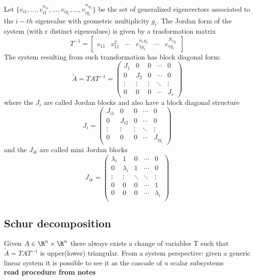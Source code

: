 \documentclass[english]{lectures}
\begin{document}
Let $\{v_{i1},\dots,v_{i1}^{n_{i1}},\dots,v_{ig_i},\dots,v_{ig_i}^{n_{ig_i}}\}$ be the set of generalized eigenvectors associated to the $i-th$ eigenvalue with geometric multiplicity $g_i$. The Jordan form of the system (with r distinct eigenvalues) is given by a trasformation matrix
\[
T^{-1}=\begin{bmatrix}
    v_{11} & v_{11}^2 & \cdots & v_{1g_1}^{n_1{g_1}} & \cdots & v_{rg_r}^{N_{rg_r}}
    \end{bmatrix}
\]
The system resulting from such transformation has block diagonal form:
\[
\tilde{A} = TAT^{-1} = \begin{pmatrix}
    J_1 & 0 & 0 & \cdots & 0\\
    0 & J_2 & 0 & \cdots & 0\\
    \vdots & \vdots & \vdots &\ddots & \vdots\\
    0 & 0 & 0 & \cdots & J_r
\end{pmatrix}
\]
where the $J_i$ are called Jordan blocks and also have a block diagonal structure
\[
J_i = \begin{pmatrix}
    J_{i1} & 0 & 0 & \cdots & 0\\
    0 & J_{i2} & 0 & \cdots & 0\\
    \vdots & \vdots & \vdots &\ddots & \vdots\\
    0 & 0 & 0 & \cdots & J_{ig_i}
\end{pmatrix}
\]
and the $J_{ik}$ are called mini Jordan blocks
\[
J_{ik} = \begin{pmatrix}
    \lambda_i & 1 & 0 & \cdots & 0\\
    0 & \lambda_i & 1 & \cdots & 0\\
    \vdots & \vdots & \ddots &\ddots & \vdots\\
    0 & 0 & 0 & \cdots & 1\\
    0 & 0 & 0 & \cdots & \lambda_i\\
\end{pmatrix}
\]



\subsection{Schur decomposition}
Given $A \in \R^n \times \R^n$ there always exists a change of variables T such that $\tilde{A}=TAT^{-1}$ is upper(lower) triangular. From a system perspective: given a generic linear system it is possible to see it as the cascade of $n$ scalar subsystems\\
\textbf{read procedure from notes}
\end{document}
